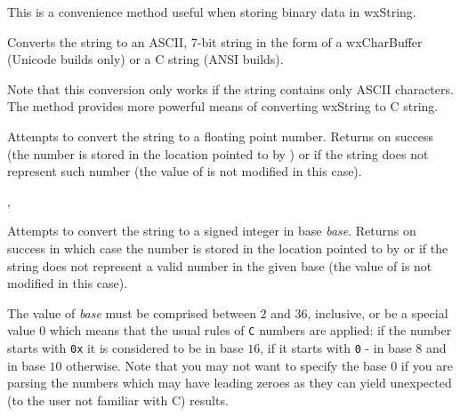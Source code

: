 This is a convenience method useful when storing binary data in wxString.





\label{wxstringtoascii}



Converts the string to an ASCII, 7-bit string in the form of
a wxCharBuffer (Unicode builds only) or a C string (ANSI builds).

Note that this conversion only works if the string contains only ASCII
characters. The  method provides more
powerful means of converting wxString to C string.


\label{wxstringtodouble}


Attempts to convert the string to a floating point number. Returns \true on
success (the number is stored in the location pointed to by ) or \false
if the string does not represent such number (the value of  is not
modified in this case).


,\\


\label{wxstringtolong}


Attempts to convert the string to a signed integer in base {\it base}. Returns
\true on success in which case the number is stored in the location
pointed to by  or \false if the string does not represent a
valid number in the given base (the value of  is not modified
in this case).

The value of {\it base} must be comprised between $2$ and $36$, inclusive, or
be a special value $0$ which means that the usual rules of {\tt C} numbers are
applied: if the number starts with {\tt 0x} it is considered to be in base
$16$, if it starts with {\tt 0} - in base $8$ and in base $10$ otherwise. Note
that you may not want to specify the base $0$ if you are parsing the numbers
which may have leading zeroes as they can yield unexpected (to the user not
familiar with C) results.


